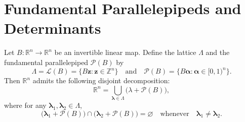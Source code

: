 \section{Fundamental Parallelepipeds and Determinants}
\begin{tcolorbox}
Let \( B: \mathbb{R}^n \to \mathbb{R}^n \) be an invertible linear map. Define the lattice \( \Lambda \) and the fundamental parallelepiped \( \mathcal{P}(B) \) by
\[
\Lambda = \mathcal{L}(B) = \{B\mathbf{z} : \mathbf{z} \in \mathbb{Z}^n\}\quad\text{and}\quad
\mathcal{P}(B) = \{B\boldsymbol{\alpha} : \boldsymbol{\alpha} \in [0,1)^n\}.
\]
Then \( \mathbb{R}^n \) admits the following disjoint decomposition:
\[
\mathbb{R}^n = \bigcup_{\boldsymbol{\lambda} \in \Lambda} \bigl({\lambda} + \mathcal{P}(B)\bigr),
\]
where for any \( \boldsymbol{\lambda}_1, \boldsymbol{\lambda}_2 \in \Lambda \),
\[
\bigl(\boldsymbol{\lambda}_1 + \mathcal{P}(B)\bigr) \cap \bigl(\boldsymbol{\lambda}_2 + \mathcal{P}(B)\bigr) = \varnothing \quad \text{whenever} \quad \boldsymbol{\lambda}_1 \neq \boldsymbol{\lambda}_2.
\]
\end{tcolorbox}
